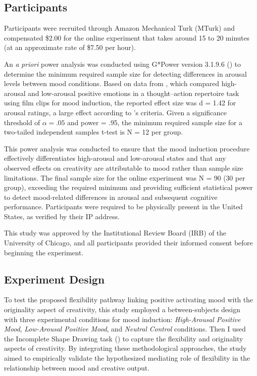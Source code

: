 \documentclass[../MA_Thesis.tex]{subfiles}
\begin{document}
\subsection*{Participants}
Participants were recruited through Amazon Mechanical Turk (MTurk) and compensated \$2.00 for the online experiment that takes around 15 to 20 minutes (at an approximate rate of \$7.50 per hour). 

An \textit{a priori} power analysis was conducted using G*Power version 3.1.9.6 (\cite{faul_gpower_2007}) to determine the minimum required sample size for detecting differences in arousal levels between mood conditions. Based on data from \textcite{sugawara_effect_2021}, which compared high-arousal and low-arousal positive emotions in a thought–action repertoire task using film clips for mood induction, the reported effect size was d = 1.42 for arousal ratings, a large effect according to \textcite{cohen_power_1992}'s criteria. Given a significance threshold of $\alpha = .05$ and power = .95, the minimum required sample size for a two-tailed independent samples t-test is N = 12 per group. 

This power analysis was conducted to ensure that the mood induction procedure effectively differentiates high-arousal and low-arousal states and that any observed effects on creativity are attributable to mood rather than sample size limitations. The final sample size for the online experiment was N = 90 (30 per group), exceeding the required minimum and providing sufficient statistical power to detect mood-related differences in arousal and subsequent cognitive performance. Participants were required to be physically present in the United States, as verified by their IP address.

This study was approved by the Institutional Review Board (IRB) of the University of Chicago, and all participants provided their informed consent before beginning the experiment.

\subsection*{Experiment Design}
To test the proposed flexibility pathway linking positive activating mood with the originality aspect of creativity, this study employed a between-subjects design with three experimental conditions for mood induction: \textit{High-Arousal Positive Mood}, \textit{Low-Arousal Positive Mood}, and \textit{Neutral Control} conditions. Then I used the Incomplete Shape Drawing task (\cite{barbot_dynamics_2018}) to capture the flexibility and originality aspects of creativity. By integrating these methodological approaches, the study aimed to empirically validate the hypothesized mediating role of flexibility in the relationship between mood and creative output.
\end{document}

